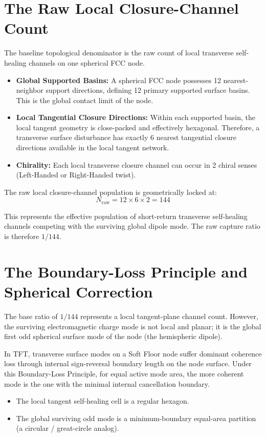 \section{The Raw Local Closure-Channel Count}
The baseline topological denominator is the raw count of local transverse self-healing channels on one spherical FCC node.

\begin{itemize}
    \item \textbf{Global Supported Basins:} A spherical FCC node possesses 12 nearest-neighbor support directions, defining 12 primary supported surface basins. This is the global contact limit of the node.
    \item \textbf{Local Tangential Closure Directions:} Within each supported basin, the local tangent geometry is close-packed and effectively hexagonal. Therefore, a transverse surface disturbance has exactly 6 nearest tangential closure directions available in the local tangent network.
    \item \textbf{Chirality:} Each local transverse closure channel can occur in 2 chiral senses (Left-Handed or Right-Handed twist).
\end{itemize}

The raw local closure-channel population is geometrically locked at:
\begin{equation}
    N_{\mathrm{raw}} = 12 \times 6 \times 2 = 144
\end{equation}

This represents the effective population of short-return transverse self-healing channels competing with the surviving global dipole mode. The raw capture ratio is therefore $1/144$.

\section{The Boundary-Loss Principle and Spherical Correction}
The base ratio of $1/144$ represents a local tangent-plane channel count. However, the surviving electromagnetic charge mode is not local and planar; it is the global first odd spherical surface mode of the node (the hemispheric dipole).

In TFT, transverse surface modes on a Soft Floor node suffer dominant coherence loss through internal sign-reversal boundary length on the node surface. Under this Boundary-Loss Principle, for equal active mode area, the more coherent mode is the one with the minimal internal cancellation boundary.
\begin{itemize}
    \item The local tangent self-healing cell is a regular hexagon.
    \item The global surviving odd mode is a minimum-boundary equal-area partition (a circular / great-circle analog).
\end{itemize}

